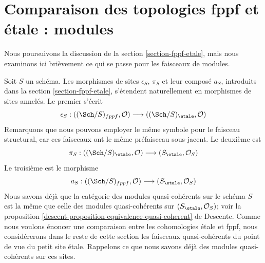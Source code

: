 \section{Comparaison des topologies fppf et étale : modules}
\label{section-fppf-etale-modules}

\noindent
Nous poursuivons la discussion de la section \ref{section-fppf-etale}, mais nous
examinons ici brièvement ce qui se passe pour les faisceaux de modules.

\medskip\noindent
Soit $S$ un schéma. Les morphismes de sites $\epsilon_S$, $\pi_S$ et
leur composé $a_S$, introduits dans la section \ref{section-fppf-etale},
s'étendent naturellement en morphismes de sites annelés. Le premier
s'écrit
$$
\epsilon_S :
((\Sch/S)_{fppf}, \mathcal{O})
\longrightarrow
((\Sch/S)_\etale, \mathcal{O})
$$
Remarquons que nous pouvons employer le même symbole pour le faisceau structural, car
ces faisceaux ont le même préfaisceau sous-jacent. Le deuxième est
$$
\pi_S :
((\Sch/S)_\etale, \mathcal{O})
\longrightarrow
(S_\etale, \mathcal{O}_S)
$$
Le troisième est le morphisme
$$
a_S :
((\Sch/S)_{fppf}, \mathcal{O})
\longrightarrow
(S_\etale, \mathcal{O}_S)
$$
Nous savons déjà que la catégorie des modules quasi-cohérents sur le
schéma $S$ est la même que celle des modules quasi-cohérents
sur $(S_\etale, \mathcal{O}_S)$; voir la
proposition \ref{descent-proposition-equivalence-quasi-coherent} de Descente.
Comme nous voulons énoncer une comparaison entre les cohomologies
étale et fppf, nous considérerons dans le reste de cette
section les faisceaux quasi-cohérents du point de vue du
petit site étale.
Rappelons ce que nous savons déjà des modules quasi-cohérents
sur ces sites.

